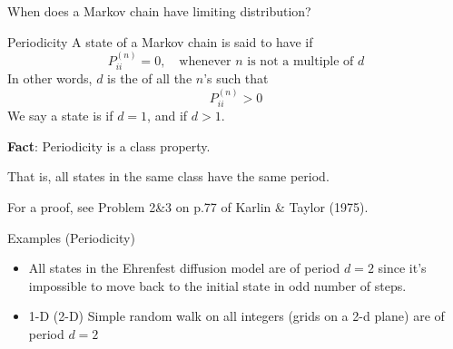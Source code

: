 \documentclass[letterpaper,handout]{beamer}
\begin{document}
\begin{frame}
	\vfill
	When does a Markov chain have limiting distribution?
	\vfill
\end{frame}
\begin{frame}{Periodicity}
A state of a Markov chain is said to have  if
$$P^{(n)}_{ii}=0,\quad\text{whenever $n$ is not a multiple of $d$}$$
In other words, $d$ is the  of all the $n$'s such that
$$
P^{(n)}_{ii}>0
$$
We say a state is  if $d=1$, and  if $d>1$.\bigskip


{\bf Fact}: Periodicity is a class property.\par That is, all states in the same class have the same period.\medskip

For a proof, see Problem 2\&3 on p.77 of Karlin \& Taylor (1975).
\end{frame}
\begin{frame}{Examples (Periodicity)}
\begin{itemize}
\item All states in the Ehrenfest diffusion model are of period $d=2$ since
it's impossible to move back to the initial state in odd number of steps.
\item 1-D (2-D) Simple random walk on all integers (grids on a 2-d plane) are of period $d=2$
%
\end{itemize}
\end{frame}
\end{document}

